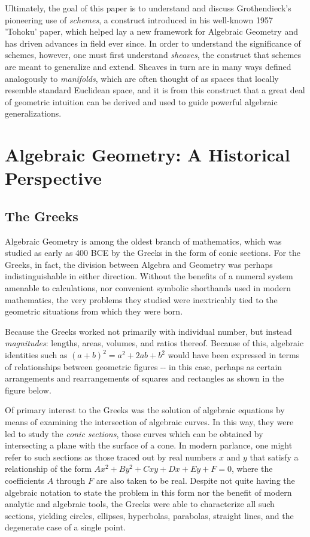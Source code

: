 \documentclass[]{article}
\begin{document}
Ultimately, the goal of this paper is to understand and discuss
Grothendieck's pioneering use of \emph{schemes}, a construct introduced
in his well-known 1957 'Tohoku' paper, which helped lay a new framework
for Algebraic Geometry and has driven advances in field ever since. In
order to understand the significance of schemes, however, one must first
understand \emph{sheaves}, the construct that schemes are meant to
generalize and extend. Sheaves in turn are in many ways defined
analogously to \emph{manifolds}, which are often thought of as spaces
that locally resemble standard Euclidean space, and it is from this
construct that a great deal of geometric intuition can be derived and
used to guide powerful algebraic generalizations.

\section{Algebraic Geometry: A Historical Perspective}\label{header-n16}

\subsection{The Greeks}\label{header-n17}

Algebraic Geometry is among the oldest branch of mathematics, which was
studied as early as 400 BCE by the Greeks in the form of conic sections.
For the Greeks, in fact, the division between Algebra and Geometry was
perhaps indistinguishable in either direction. Without the benefits of a
numeral system amenable to calculations, nor convenient symbolic
shorthands used in modern mathematics, the very problems they studied
were inextricably tied to the geometric situations from which they were
born.

Because the Greeks worked not primarily with individual number, but
instead \emph{magnitudes}: lengths, areas, volumes, and ratios thereof.
Because of this, algebraic identities such as
\((a+b)^2 = a^2 + 2ab + b^2\) would have been expressed in terms of
relationships between geometric figures -\/- in this case, perhaps as
certain arrangements and rearrangements of squares and rectangles as
shown in the figure below.

Of primary interest to the Greeks was the solution of algebraic
equations by means of examining the intersection of algebraic curves. In
this way, they were led to study the \emph{conic sections}, those curves
which can be obtained by intersecting a plane with the surface of a
cone. In modern parlance, one might refer to such sections as those
traced out by real numbers \(x\) and \(y\) that satisfy a relationship
of the form \(Ax^2 +By^2 + Cxy + Dx + Ey + F = 0\), where the
coefficients \(A\) through \(F\) are also taken to be real. Despite not
quite having the algebraic notation to state the problem in this form
nor the benefit of modern analytic and algebraic tools, the Greeks were
able to characterize all such sections, yielding circles, ellipses,
hyperbolas, parabolas, straight lines, and the degenerate case of a
single point.
\end{document}
